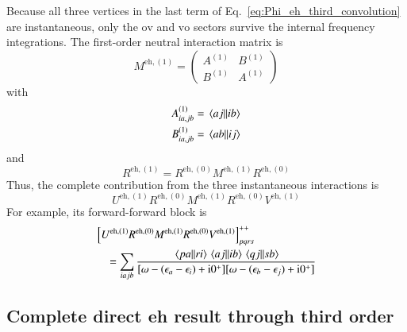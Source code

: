 \documentclass[aip,jcp,reprint,noshowkeys,superscriptaddress]{revtex4-1}
\newcommand{\eps}{\epsilon}
\newcommand{\ii}{\mathrm{i}}
\newcommand{\eh}{\text{eh}}
\begin{document}
Because all three vertices in the last term of
Eq.~\eqref{eq:Phi_eh_third_convolution} are instantaneous, only the $\text{ov}$ and
$\text{vo}$ sectors survive the internal frequency integrations.
The first-order neutral interaction matrix is
\begin{equation}
    M^{\eh,(1)}
    =
    \begin{pmatrix}
    A^{(1)}&B^{(1)}
    \\
    B^{(1)}&A^{(1)}
    \end{pmatrix}
    \label{eq:M_eh_first}
\end{equation}
with
\begin{align}
    A^{(1)}_{ia,jb}
    &=
    \mel{aj}{}{ib}
    \\
    B^{(1)}_{ia,jb}
    &=
    \mel{ab}{}{ij}
\end{align}
and
\begin{equation}
    R^{\eh,(1)}
    =
    R^{\eh,(0)}M^{\eh,(1)}R^{\eh,(0)}
    \label{eq:R_eh_first}
\end{equation}
Thus, the complete contribution from the three instantaneous interactions is
\begin{equation}
    U^{\eh,(1)}R^{\eh,(0)}M^{\eh,(1)}R^{\eh,(0)}V^{\eh,(1)}
    \label{eq:Phi_eh_third_three_bare}
\end{equation}
For example, its forward-forward block is
\begin{equation}
    \begin{split}
    &\left[
    U^{\eh,(1)}R^{\eh,(0)}M^{\eh,(1)}R^{\eh,(0)}V^{\eh,(1)}
    \right]^{++}_{pqrs}
    \\
    &\quad=
    \sum_{iajb}
    \frac{
    \mel{pa}{}{ri}\mel{aj}{}{ib}\mel{qj}{}{sb}
    }
    {[\omega-(\eps_a-\eps_i)+\ii0^+]
     [\omega-(\eps_b-\eps_j)+\ii0^+]}
    \end{split}
    \label{eq:Phi_eh_third_three_bare_pp}
\end{equation}

\subsection{Complete direct eh result through third order}
\end{document}
